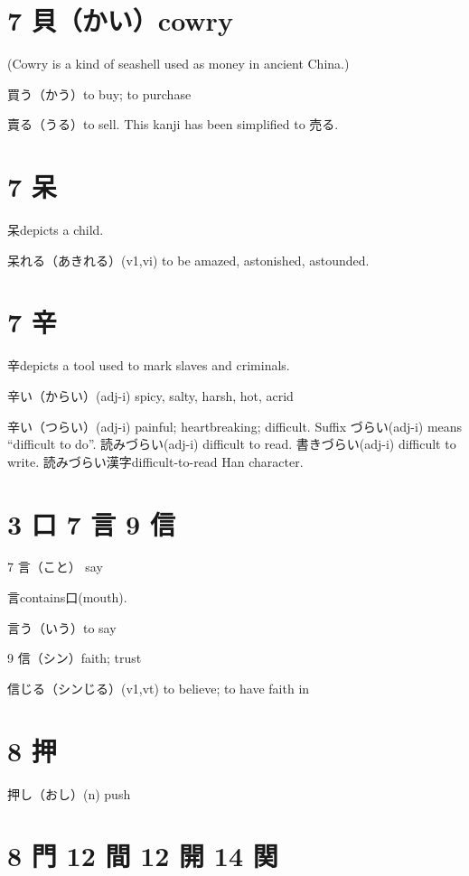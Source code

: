 \section{7 貝（かい）cowry}

(Cowry is a kind of seashell used as money in ancient China.)

買う（かう）to buy; to purchase

賣る（うる）to sell.
This kanji has been simplified to 売る.

\section{7 呆}

呆depicts a child.

呆れる（あきれる）(v1,vi) to be amazed, astonished, astounded.

\section{7 辛}

辛depicts a tool used to mark slaves and criminals.

辛い（からい）(adj-i) spicy, salty, harsh, hot, acrid

辛い（つらい）(adj-i) painful; heartbreaking; difficult.
Suffix づらい(adj-i) means ``difficult to do''.
読みづらい(adj-i) difficult to read.
書きづらい(adj-i) difficult to write.
読みづらい漢字difficult-to-read Han character.

\section{3 口 7 言 9 信}

7 言（こと） say

言contains口(mouth).

言う（いう）to say

9 信（シン）faith; trust

信じる（シンじる）(v1,vt) to believe; to have faith in

\section{8 押}

押し（おし）(n) push

\section{8 門 12 間 12 開 14 関}


